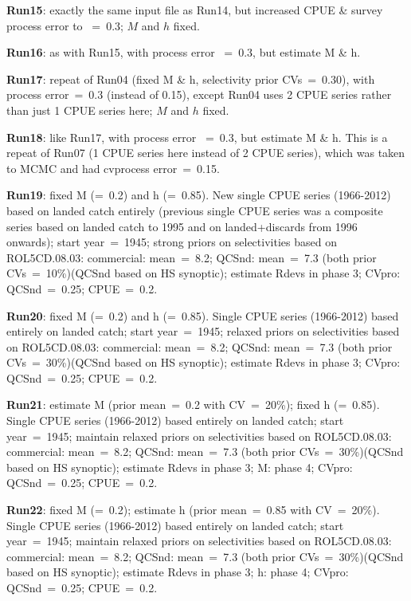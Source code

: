 {\bf Run15}: exactly the same input file as Run14, but increased CPUE \& survey process error to ~=~0.3; $M$ and $h$ fixed. \newline

{\bf Run16}: as with Run15, with process error ~=~0.3, but estimate M \& h. \newline

{\bf Run17}: repeat of Run04 (fixed M \& h, selectivity prior CVs~=~0.30), with process error~=~0.3 (instead of 0.15), except Run04 uses 2 CPUE series rather than just 1 CPUE series here; $M$ and $h$ fixed. \newline

{\bf Run18}: like Run17, with process error ~=~0.3, but estimate M \& h.  This is a repeat of Run07 (1 CPUE series here instead of 2 CPUE series), which was taken to MCMC and had cvprocess error~=~0.15. \newline

{\bf Run19}: fixed M (=~0.2) and h (=~0.85). New single CPUE series (1966-2012) based on landed catch entirely (previous single CPUE series was a composite series based on landed catch to 1995 and on landed+discards from 1996 onwards); start year~=~1945; strong priors on selectivities based on ROL5CD.08.03: commercial: mean~=~8.2; QCSnd: mean~=~7.3 (both prior CVs~=~10\%)(QCSnd based on HS synoptic); estimate Rdevs in phase 3; CVpro: QCSnd~=~0.25; CPUE~=~0.2. \newline

{\bf Run20}: fixed M (=~0.2) and h (=~0.85). Single CPUE series (1966-2012) based entirely on landed catch; start year~=~1945; relaxed priors on selectivities based on ROL5CD.08.03: commercial: mean~=~8.2; QCSnd: mean~=~7.3 (both prior CVs~=~30\%)(QCSnd based on HS synoptic); estimate Rdevs in phase 3; CVpro: QCSnd~=~0.25; CPUE~=~0.2. \newline

{\bf Run21}: estimate M (prior mean~=~0.2 with CV~=~20\%); fixed h (=~0.85).  Single CPUE series (1966-2012) based entirely on landed catch; start year~=~1945; maintain relaxed priors on selectivities based on ROL5CD.08.03: commercial: mean~=~8.2; QCSnd: mean~=~7.3 (both prior CVs~=~30\%)(QCSnd based on HS synoptic); estimate Rdevs in phase 3; M: phase 4; CVpro: QCSnd~=~0.25; CPUE~=~0.2. \newline

{\bf Run22}: fixed M (=~0.2); estimate h (prior mean~=~0.85 with CV~=~20\%).  Single CPUE series (1966-2012) based entirely on landed catch; start year~=~1945; maintain relaxed priors on selectivities based on ROL5CD.08.03: commercial: mean~=~8.2; QCSnd: mean~=~7.3 (both prior CVs~=~30\%)(QCSnd based on HS synoptic); estimate Rdevs in phase 3; h: phase 4; CVpro: QCSnd~=~0.25; CPUE~=~0.2. \newline

